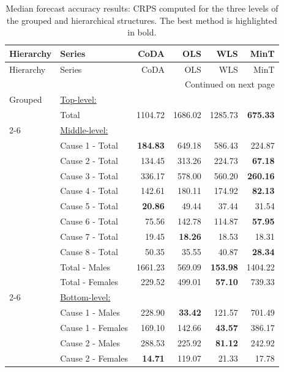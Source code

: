 \begin{center}
\tabcolsep 0.315in
\renewcommand\arraystretch{0.98}
\begin{small}
\begin{longtable}{@{}llrrrr@{}}
\caption{\small Median forecast accuracy results: CRPS computed for the three levels of the grouped and hierarchical structures. The best method is highlighted in bold.}\label{tab:crps_median} \\
\toprule
Hierarchy & Series & CoDA & OLS & WLS & MinT \\
\midrule
\endfirsthead
\toprule
Hierarchy & Series & CoDA & OLS & WLS & MinT \\
\midrule
\endhead
\hline \multicolumn{6}{r}{{Continued on next page}} \\
\endfoot
\endlastfoot
Grouped & \multicolumn{5}{l}{\underline{Top-level:}}\\
& Total & 1104.72 & 1686.02 & 1285.73 & \textbf{675.33} \\
\cmidrule{2-6}
& \multicolumn{5}{l}{\underline{Middle-level:}}\\
& Cause 1 - Total & \textbf{184.83} & 649.18 & 586.43 & 224.87 \\
& Cause 2 - Total & 134.45 & 313.26 & 224.73 & \textbf{67.18} \\
& Cause 3 - Total & 336.17 & 578.00 & 560.20 & \textbf{260.16} \\
& Cause 4 - Total & 142.61 & 180.11 & 174.92 & \textbf{82.13} \\
& Cause 5 - Total & \textbf{20.86} & 49.44 & 37.44 & 31.54 \\
& Cause 6 - Total & 75.56 & 142.78 & 114.87 & \textbf{57.95} \\
& Cause 7 - Total & 19.45 & \textbf{18.26} & 18.53 & 18.31 \\
& Cause 8 - Total & 50.35 & 35.55 & 40.87 & \textbf{28.34} \\
& Total - Males & 1661.23 & 569.09 & \textbf{153.98} & 1404.22 \\
& Total - Females & 229.52 & 499.01 & \textbf{57.10} & 739.33 \\
\cmidrule{2-6}
& \multicolumn{5}{l}{\underline{Bottom-level:}}\\
& Cause 1 - Males & 228.90 & \textbf{33.42} & 121.57 & 701.49 \\
& Cause 1 - Females & 169.10 & 142.66 & \textbf{43.57} & 386.17 \\
& Cause 2 - Males & 288.53 & 225.92 & \textbf{81.12} & 242.92 \\
& Cause 2 - Females & \textbf{14.71} & 119.07 & 21.33 & 17.78 \\

\end{longtable}
\end{small}
\end{center}
